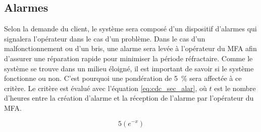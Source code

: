 

\subsection{Alarmes}
\label{s:cdc_sec_alar}

Selon la demande du client, le système sera composé d’un dispositif d’alarmes qui signalera l’opérateur dans le cas d’un problème.
Dans le cas d’un malfonctionnement ou d’un bris, une alarme sera levée à l’opérateur du MFA afin d’assurer une réparation rapide pour minimiser la période réfractaire.
Comme le système se trouve dans un milieu éloigné, il est important de savoir si le système fonctionne ou non.
C’est pourquoi une pondération de 5~\% sera affectée à ce critère.
\wl
Le critère est évalué avec l'équation \ref{eq:cdc_sec_alar}, où $t$ est le nombre d'heures entre la création d'alarme et la réception de l'alarme par l'opérateur du MFA.

\begin{equation}\label{eq:cdc_sec_alar}
	5\left(e^{-x}\right)
\end{equation}